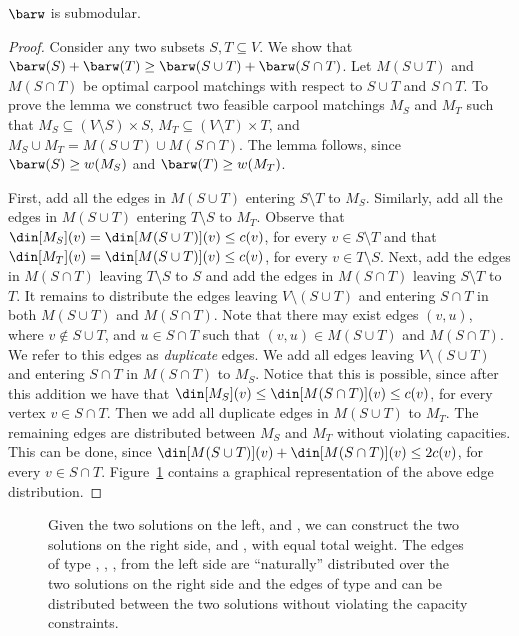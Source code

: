 \begin{lemma}
$\barw$ is submodular.
\end{lemma}
\begin{proof}
Consider any two subsets $S, T \subseteq V$.  We show that $\barw(S)
+ \barw(T) \geq \barw(S \cup T) + \barw(S \cap T)$.
%
Let $M(S \cup T)$ and $M(S \cap T)$ be optimal carpool matchings with
respect to $S \cup T$ and $S \cap T$.
%
To prove the lemma we construct two feasible carpool matchings $M_S$
and $M_T$ such that $M_S \subseteq (V \setminus S) \times S$,
$M_T \subseteq (V \setminus T) \times T$, and $M_S \cup M_T = M(S \cup
T) \cup M(S \cap T)$.
%
The lemma follows, since $\barw(S) \geq w(M_S)$ and $\barw(T) \geq
w(M_T)$.

First, add all the edges in $M(S \cup T)$ entering $S \setminus T$ to
$M_S$.  Similarly, add all the edges in $M(S \cup T)$ entering
$T \setminus S$ to $M_T$.  Observe that $\din[M_S](v) = \din[M(S \cup
T)](v) \leq c(v)$, for every $v \in S \setminus T$ and that
$\din[M_T](v) = \din[M(S \cup T)](v) \leq c(v)$, for every $v \in
T \setminus S$.
%
Next, add the edges in $M(S \cap T)$ leaving $T \setminus S$ to $S$
and add the edges in $M(S \cap T)$ leaving $S \setminus T$ to $T$.
%
It remains to distribute the edges leaving $V \setminus (S \cup T)$
and entering $S \cap T$ in both $M(S \cup T)$ and $M(S \cap T)$.  Note
that there may exist edges $(v,u)$, where $v \not\in S \cup T$, and
$u \in S \cap T$ such that $(v,u) \in M(S \cup T)$ and $M(S \cap T)$.
We refer to this edges as \emph{duplicate} edges.
%
We add all edges leaving $V \setminus (S \cup T)$ and entering $S \cap
T$ in $M(S \cap T)$ to $M_S$.  Notice that this is possible, since
after this addition we have that $\din[M_S](v) \leq \din[M(S \cap
T)](v) \leq c(v)$, for every vertex $v \in S \cap T$.
%
Then we add all duplicate edges in $M(S \cup T)$ to $M_T$.
%
The remaining edges are distributed between $M_S$ and $M_T$ without
violating capacities.  This can be done, since $\din[M(S \cup T)](v)
+ \din[M(S \cap T)](v) \leq 2c(v)$, for every $v \in S \cap T$.
%
Figure~\ref{fig:sub} contains a graphical representation of the above
edge distribution.
\end{proof}

\begin{figure}
\caption[]{%
Given the two solutions on the left, 
 and , we
can construct the two solutions on the right side,
 and , with equal total weight.
The edges of type 
, 
, 
, 
from the left side are ``naturally'' distributed over the two solutions on the
right side and the edges of type  and  can be
distributed between the two solutions without violating the capacity constraints.
}

\label{fig:sub}
\end{figure}


